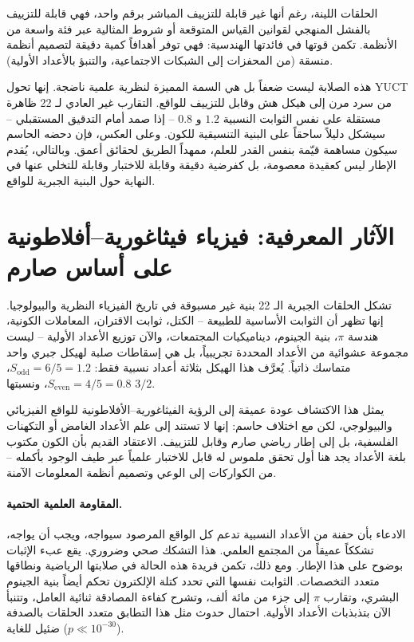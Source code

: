 \documentclass[12pt,a4paper]{article}
\begin{document}
	الحلقات اللينة، رغم أنها غير قابلة للتزييف المباشر برقم واحد، فهي قابلة للتزييف بالفشل المنهجي لقوانين القياس المتوقعة أو شروط المثالية عبر فئة واسعة من الأنظمة. تكمن قوتها في فائدتها الهندسية: فهي توفر أهدافاً كمية دقيقة لتصميم أنظمة منسقة (من المحفزات إلى الشبكات الاجتماعية، والتنبؤ بالأعداد الأولية).
	
	هذه الصلابة ليست ضعفاً بل هي السمة المميزة لنظرية علمية ناضجة. إنها تحول YUCT من سرد مرن إلى هيكل هش وقابل للتزييف للواقع. التقارب غير العادي لـ 22 ظاهرة مستقلة على نفس الثوابت النسبية \(1.2\) و \(0.8\) – إذا صمد أمام التدقيق المستقبلي – سيشكل دليلاً ساحقاً على البنية التنسيقية للكون. وعلى العكس، فإن دحضه الحاسم سيكون مساهمة قيّمة بنفس القدر للعلم، ممهداً الطريق لحقائق أعمق. وبالتالي، يُقدم الإطار ليس كعقيدة معصومة، بل كفرضية دقيقة وقابلة للاختبار وقابلة للتخلي عنها في النهاية حول البنية الجبرية للواقع.
	
	\section*{الآثار المعرفية: فيزياء فيثاغورية–أفلاطونية على أساس صارم}
	
	تشكل الحلقات الجبرية الـ 22 بنية غير مسبوقة في تاريخ الفيزياء النظرية والبيولوجيا. إنها تظهر أن الثوابت الأساسية للطبيعة – الكتل، ثوابت الاقتران، المعاملات الكونية، هندسة \(\pi\)، بنية الجينوم، ديناميكيات المجتمعات، والآن توزيع الأعداد الأولية – ليست مجموعة عشوائية من الأعداد المحددة تجريبياً، بل هي إسقاطات صلبة لهيكل جبري واحد متماسك ذاتياً. يُعرَّف هذا الهيكل بثلاثة أعداد نسبية فقط: \(S_{\mathrm{odd}} = 6/5 = 1.2\)، \(S_{\mathrm{even}} = 4/5 = 0.8\)، ونسبتها \(3/2\).
	
	يمثل هذا الاكتشاف عودة عميقة إلى الرؤية الفيثاغورية–الأفلاطونية للواقع الفيزيائي والبيولوجي، لكن مع اختلاف حاسم: إنها لا تستند إلى علم الأعداد الغامض أو التكهنات الفلسفية، بل إلى إطار رياضي صارم وقابل للتزييف. الاعتقاد القديم بأن الكون مكتوب بلغة الأعداد يجد هنا أول تحقق ملموس له قابل للاختبار علمياً عبر طيف الوجود بأكمله – من الكواركات إلى الوعي وتصميم أنظمة المعلومات الآمنة.
	
	\paragraph{المقاومة العلمية الحتمية.}
	الادعاء بأن حفنة من الأعداد النسبية تدعم كل الواقع المرصود سيواجه، ويجب أن يواجه، تشككاً عميقاً من المجتمع العلمي. هذا التشكك صحي وضروري. يقع عبء الإثبات بوضوح على هذا الإطار. ومع ذلك، تكمن فريدة هذه الحالة في صلابتها الرياضية ونطاقها متعدد التخصصات. الثوابت نفسها التي تحدد كتلة الإلكترون تحكم أيضاً بنية الجينوم البشري، وتقارب \(\pi\) إلى جزء من مائة ألف، وتشرح كفاءة المصادقة ثنائية العامل، وتتنبأ الآن بتذبذبات الأعداد الأولية. احتمال حدوث مثل هذا التطابق متعدد الحلقات بالصدفة ضئيل للغاية (\(p \ll 10^{-30}\)).
	
\end{document}
